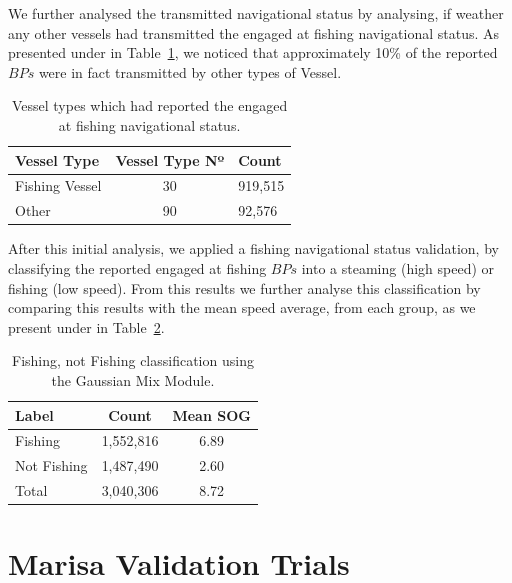 We further analysed the transmitted navigational status by analysing, if weather any other vessels had transmitted the engaged at fishing navigational status. As presented under in Table~\ref{Table : 5 Fishing Vessel Type}, we noticed that approximately 10\% of the reported $BPs$ were in fact transmitted by other types of Vessel.

\begin{table}[H]
\centering
\caption{Vessel types which had reported the engaged at fishing navigational status.}
\label{Table : 5 Fishing Vessel Type}
\begin{tabular}{@{}lcl@{}}
\toprule
Vessel Type & Vessel Type Nº & Count \\ \midrule
Fishing Vessel & 30 & 919,515 \\
Other & 90 & 92,576 \\ \bottomrule
\end{tabular}
\end{table}

After this initial analysis, we applied a fishing navigational status validation, by classifying the reported engaged at fishing $BPs$ into a steaming (high speed) or fishing (low speed). From this results we further analyse this classification by comparing this results with the mean speed average, from each group, as we present under in Table~\ref{table: ch5 GMM}.

\begin{table}[H]
\centering
\caption{Fishing, not Fishing classification using the Gaussian Mix Module.}
\label{table: ch5 GMM}
\begin{tabular}{@{}lcc@{}}
\toprule
Label       & Count     & Mean SOG \\ \midrule
Fishing     & 1,552,816 & 6.89   \\
Not Fishing & 1,487,490 & 2.60   \\
Total       & 3,040,306 & 8.72   \\ \bottomrule
\end{tabular}
\end{table}

\section{Marisa Validation Trials}
\label{Section: 5 Marisa Validation}


